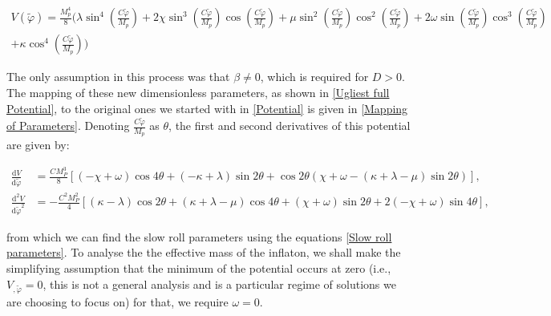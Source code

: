 \documentclass[aps,prd,reprint,preprintnumbers,showpacs,floatfix,nofootinbib,superscript address]{revtex4-2}
\newcommand{\wb}[1]{{\color[RGB]{255,0,0}{\textbf{\textit{[WB: #1]}}}}}
\begin{document}
\begin{widetext}
    \begin{equation} 
    \begin{aligned} \label{Ugliest full Potential}
        V(\tilde{\varphi}) =  \frac{M_p^4}{8} \Bigg(\lambda \sin^4\left( \frac{C \tilde{\varphi}}{M_p}\right) + 2 \chi \sin^3\left( \frac{C \tilde{\varphi}}{M_p}\right) \cos\left( \frac{C \tilde{\varphi}}{M_p}\right)  + \mu \sin^2\left( \frac{C \tilde{\varphi}}{M_p}\right) \cos^2\left( \frac{C \tilde{\varphi}}{M_p}\right) + 2\omega \sin\left( \frac{C \tilde{\varphi}}{M_p}\right) \cos^3\left( \frac{C \tilde{\varphi}}{M_p}\right)  \\ + \kappa \cos^4\left( \frac{C \tilde{\varphi}}{M_p}\right) \Bigg)
    \end{aligned}
\end{equation}
\end{widetext}
The only assumption in this process was that $\beta \neq 0$, which is required for $D > 0$. The mapping of these new dimensionless parameters, as shown in \cref{Ugliest full Potential}, to the original ones we started with in \cref{Potential} is given in \cref{Mapping of Parameters}. Denoting $\frac{C\tilde{\varphi}}{M_p}$ as $\theta$, the first and second derivatives of this potential are given by:

\begin{widetext}
    \begin{subequations} 
        \begin{align} \label{Derivatives of Pot}
            \frac{\text{d}V}{\text{d}\tilde{\varphi}} &= \frac{CM_P^3}{8} \left[ (-\chi + \omega) \cos4\theta + (-\kappa + \lambda) \sin2\theta + \cos2\theta (\chi + \omega - (\kappa + \lambda - \mu ) 
            \sin2\theta) \right] , \\
            \frac{\text{d}^2V}{\text{d}\tilde{\varphi}^2} &= -\frac{C^2M_P^2}{4} \left[ (\kappa - \lambda) \cos2\theta + (\kappa + \lambda - \mu) \cos4\theta + (\chi+\omega) \sin2\theta + 2(-\chi + \omega) \sin4\theta \right],
        \end{align}
    \end{subequations}
\end{widetext}
from which we can find the slow roll parameters using the equations \cref{Slow roll parameters}. To analyse the the effective mass of the inflaton, we shall make the simplifying assumption that the minimum of the potential occurs at zero (i.e., $V_{,\tilde{\varphi}} = 0$, this is not a general analysis and is a particular regime of solutions we are choosing to focus on) for that, we require $\omega = 0$.
\end{document}
